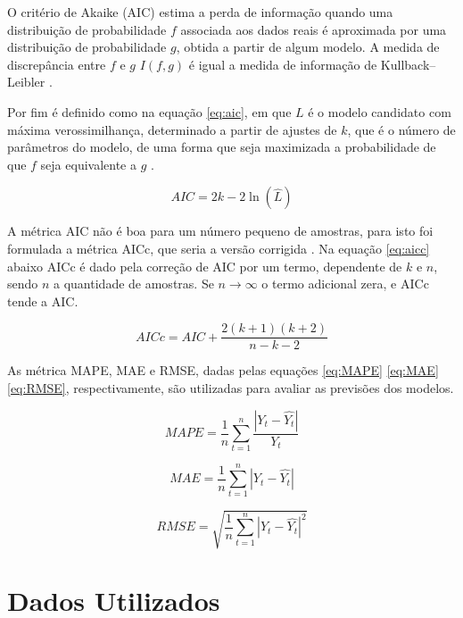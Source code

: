 O critério de Akaike (AIC) estima a perda de informação quando uma distribuição de probabilidade $f$ associada aos dados reais é aproximada por uma distribuição de probabilidade $g$, obtida a partir de algum modelo. A medida de discrepância entre $f$ e $g$ $I(f,g)$ é igual a medida de informação de Kullback–Leibler \cite{wagenmakers2004aic}.

Por fim é definido como na equação \ref{eq:aic}, em que $L$ é o modelo candidato com máxima verossimilhança, determinado a partir de ajustes de $k$, que é o número de parâmetros do modelo, de uma forma que seja maximizada a probabilidade de que $f$ seja equivalente a $g$ \cite{wagenmakers2004aic}.

\begin{equation}
\label{eq:aic}
    AIC = 2k - 2\ln(\hat L)
\end{equation}

A métrica AIC não é boa para um número pequeno de amostras, para isto foi formulada a métrica AICc, que seria a versão corrigida \cite{hurvich1989regression}. Na equação \ref{eq:aicc} abaixo AICc é dado pela correção de AIC por um termo, dependente de $k$ e $n$, sendo $n$ a quantidade de amostras. Se $n \to \infty$ o termo adicional zera, e AICc tende a AIC. 

\begin{equation}
\label{eq:aicc}
    AICc = AIC + \frac{2(k+1)(k+2)}{n - k -2}
\end{equation}

As métrica MAPE, MAE e RMSE, dadas pelas equações \ref{eq:MAPE} \ref{eq:MAE} \ref{eq:RMSE}, respectivamente, são utilizadas para avaliar as previsões dos modelos. 

\begin{equation}
\label{eq:MAPE}
    MAPE = \frac{1}{n}\sum_{t=1}^{n} \frac{|Y_t - \hat{Y_t}|}{Y_t}
\end{equation}

\begin{equation}
\label{eq:MAE}
    MAE = \frac{1}{n}\sum_{t=1}^{n} |Y_t - \hat{Y_t}|
\end{equation}

\begin{equation}
\label{eq:RMSE}
    RMSE = \sqrt{\frac{1}{n}\sum_{t=1}^{n} |Y_t - \hat{Y_t}|^2}
\end{equation}

\section{Dados Utilizados} 
\label{sec:dados_prep}

